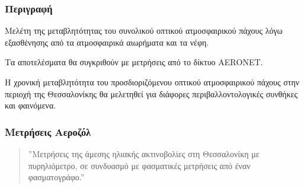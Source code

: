 \documentclass[noamsthm,12pt]{beamer}
\begin{document}
% 
% 
% 
% 	
% 	
% 	
\begin{frame}
	\frametitle{Περιγραφή}
	\begin{block}{}
	\justifying
	Μελέτη της μεταβλητότητας του συνολικού οπτικού ατμοσφαιρικού πάχους λόγω εξασθένησης από τα ατμοσφαιρικά αιωρήματα και τα νέφη.	
	\end{block}
	\begin{block}{}
	
	\end{block}
	
	\begin{block}{} 
	\justifying
	 Τα αποτελέσματα θα συγκριθούν με μετρήσεις από το δίκτυο ΑΕRΟΝΕΤ.
	\end{block}
	
	\begin{block}{}
	\justifying
	Η χρονική μεταβλητότητα του προσδιοριζόμενου οπτικού ατμοσφαιρικού πάχους στην περιοχή της Θεσσαλονίκης θα μελετηθεί για διάφορες περιβαλλοντολογικές συνθήκες και φαινόμενα.
	 \end{block}
	\hfill \phantom{s}
	 
\end{frame}




\begin{frame}
	\frametitle{Μετρήσεις Αεροζόλ}
	
	\begin{quote}
		\justifying
	 ''Μετρήσεις της άμεσης ηλιακής ακτινοβολίες στη Θεσσαλονίκη με πυρηλιόμετρο, σε συνδυασμό με φασματικές μετρήσεις από έναν φασματογράφο.''
	\end{quote}

	
\end{frame}
\end{document}
